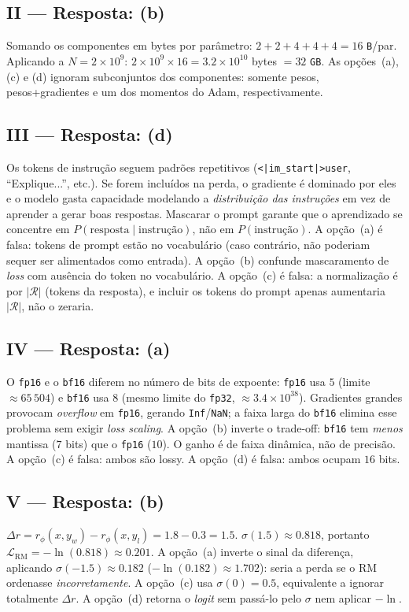 \documentclass{dlproblemset}
\begin{document}
\subsection*{II — Resposta: (b)}
Somando os componentes em bytes por parâmetro:
$2 + 2 + 4 + 4 + 4 = 16$ \texttt{B}/par.
Aplicando a $N = 2\times 10^9$:
$2\times 10^9 \times 16 = 3.2\times 10^{10}$ bytes $= 32$ \texttt{GB}.
As opções~(a), (c) e (d) ignoram subconjuntos dos componentes: somente pesos,
pesos+gradientes e um dos momentos do Adam, respectivamente.

\subsection*{III — Resposta: (d)}
Os tokens de instrução seguem padrões repetitivos (\texttt{<|im\_start|>user},
``Explique...'', etc.). Se forem incluídos na perda, o gradiente é dominado
por eles e o modelo gasta capacidade modelando a \emph{distribuição das
instruções} em vez de aprender a gerar boas respostas. Mascarar o prompt
garante que o aprendizado se concentre em $P(\text{resposta} \mid \text{instrução})$,
não em $P(\text{instrução})$.
A opção~(a) é falsa: tokens de prompt estão no vocabulário (caso contrário,
não poderiam sequer ser alimentados como entrada).
A opção~(b) confunde mascaramento de \emph{loss} com ausência do token no
vocabulário.
A opção~(c) é falsa: a normalização é por $|\mathcal{R}|$ (tokens da resposta),
e incluir os tokens do prompt apenas aumentaria $|\mathcal{R}|$, não o zeraria.

\subsection*{IV — Resposta: (a)}
O \texttt{fp16} e o \texttt{bf16} diferem no número de bits
de expoente: \texttt{fp16} usa $5$ (limite $\approx 65\,504$) e \texttt{bf16}
usa $8$ (mesmo limite do \texttt{fp32}, $\approx 3.4\times 10^{38}$).
Gradientes grandes provocam \textit{overflow} em \texttt{fp16}, gerando
\texttt{Inf}/\texttt{NaN}; a faixa larga do \texttt{bf16} elimina esse
problema sem exigir \textit{loss scaling}.
A opção~(b) inverte o trade-off: \texttt{bf16} tem \emph{menos} mantissa
($7$ bits) que o \texttt{fp16} ($10$). O ganho é de faixa dinâmica, não de precisão.
A opção~(c) é falsa: ambos são lossy.
A opção~(d) é falsa: ambos ocupam $16$ bits.

\subsection*{V — Resposta: (b)}
$\Delta r = r_\phi(x,y_w) - r_\phi(x,y_l) = 1.8 - 0.3 = 1.5$.
$\sigma(1.5) \approx 0.818$, portanto
$\mathcal{L}_{\text{RM}} = -\ln(0.818) \approx 0.201$.
A opção~(a) inverte o sinal da diferença, aplicando $\sigma(-1.5) \approx 0.182$
($-\ln(0.182) \approx 1.702$): seria a perda se o RM ordenasse
\emph{incorretamente}.
A opção~(c) usa $\sigma(0) = 0.5$, equivalente a ignorar totalmente
$\Delta r$.
A opção~(d) retorna o \textit{logit} sem passá-lo pelo $\sigma$ nem aplicar
$-\ln$.
\end{document}
